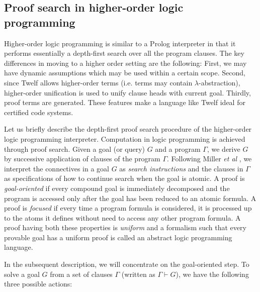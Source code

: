 \documentclass{acmconf}
\newcommand{\vd}{\vdash}
\begin{document}
\subsection{Proof search in higher-order logic programming}

Higher-order logic programming is similar to a Prolog interpreter in
that it performs essentially a depth-first search over all the program
clauses. The key differences in moving to a higher order setting are
the following: First, we may have dynamic assumptions which may be
used within a certain scope. Second, since Twelf allows higher-order
terms (i.e. terms may contain $\lambda$-abstraction), higher-order
unification is used to unify clause heads with current goal. Thirdly,
proof terms are generated. These features make a language like Twelf
ideal for certified code systems.

Let us briefly describe the depth-first proof search procedure of
the higher-order logic programming interpreter. Computation in logic
programming is achieved through proof search. Given a goal (or query)
$G$ and a program $\Gamma$, we derive $G$ by successive application of
clauses of the program $\Gamma$. Following Miller {\em{et al}}
\cite{Miller91apal}, we interpret the connectives in a goal $G$ as
{\em{search instructions}} and the clauses in $\Gamma$ as
specifications of how to continue search when the goal is atomic. A
proof is {\em{goal-oriented}} if every compound goal is immediately
decomposed and the program is accessed only after the goal has been
reduced to an atomic formula. A proof is {\em{focused}} if every time
a program formula is considered, it is processed up to the atoms it
defines without need to access any other program formula. A proof
having both these properties is {\em{uniform}} and a formalism such
that every provable goal has a uniform proof is called an abstract
logic programming language.

In the subsequent description, we will concentrate on the
goal-oriented step. To solve a goal $G$ from a set of clauses $\Gamma$
(written as $\Gamma \vd G$), we have the following three possible
actions:   
\end{document}
